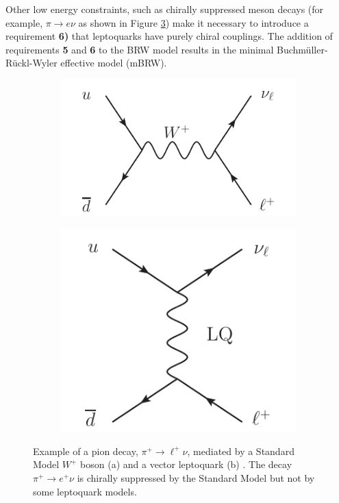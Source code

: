 Other low energy constraints, such as chirally suppressed meson decays
(for example, $\pi \rightarrow e\nu$ as shown in Figure \ref{fig:feynman_LO_FD_pion})
make it necessary to introduce a requirement {\bf 6)} that leptoquarks have
purely chiral couplings.
The addition of requirements {\bf 5} and {\bf 6} to the BRW model results in the 
minimal Buchm{\"u}ller-R{\"u}ckl-Wyler effective model 
(mBRW).

\begin{figure}
  \centering
  \begin{subfigure}[b]{0.45\textwidth}
    \includegraphics[width=\textwidth]{tex/theory/fig/pion_w}
    \caption{}
    \label{fig:feynman_LO_FD_pion_w}
  \end{subfigure}
  \begin{subfigure}[b]{0.30\textwidth}
    \includegraphics[width=\textwidth]{tex/theory/fig/pion_lq}
    \caption{}
    \label{fig:feynman_LO_FD_pion_LQ}
  \end{subfigure}
  \caption{
    Example of a pion decay, $\pi^{+} \rightarrow \ell^{+}\nu$, mediated
    by a Standard Model $W^{+}$ boson (a) and a vector leptoquark (b) \cite{pati-salam-su4-1,pati-salam-su4-2}. 
    The decay $\pi^{+} \rightarrow e^{+}\nu$ is chirally suppressed by the Standard Model but
    not by some leptoquark models.
  }
  \label{fig:feynman_LO_FD_pion}
\end{figure}

